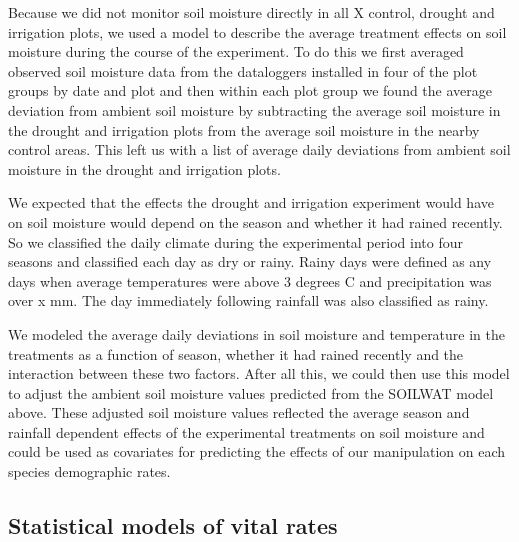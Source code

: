 \documentclass[11pt]{article}
\begin{document}
\begin{doublespacing}
Because we did not monitor soil moisture directly in all X control, drought and irrigation plots, we used a model to describe the average treatment effects on soil moisture during the course of the experiment. To do this we first averaged observed soil moisture data from the dataloggers installed in four of the plot groups by date and plot and then within each plot group we found the average deviation from ambient soil moisture by subtracting the average soil moisture in the drought and irrigation plots from the average soil moisture in the nearby control areas. This left us with a list of average daily deviations from ambient soil moisture in the drought and irrigation plots.

We expected that the effects the drought and irrigation experiment would have on soil moisture would depend on the season and whether it had rained recently.  So we classified the daily climate during the experimental period into four seasons and classified each day as dry or rainy. Rainy days were defined as any days when average temperatures were above 3 degrees C and precipitation was over x mm. The day immediately following rainfall was also classified as rainy. 

We modeled the average daily deviations in soil moisture and temperature in the treatments as a function of season, whether it had rained recently and the interaction between these two factors. After all this, we could then use this model to adjust the ambient soil moisture values predicted from the SOILWAT model above. These adjusted soil moisture values reflected the average season and rainfall dependent effects of the experimental treatments on soil moisture and could be used as covariates for predicting the effects of our manipulation on each species demographic rates. 


\subsection*{Statistical models of vital rates}


\end{doublespacing}
\end{document}
